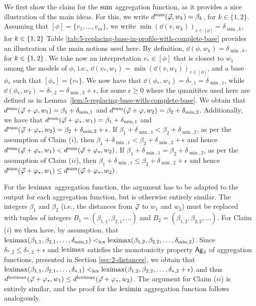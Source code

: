 \begin{prf*}{}{}%
	We first show the claim for the $\ssum$ aggregation function, 
	as it provides a nice illustration of the main ideas.
	For this, we write $\dd^\ssum(\P,w_k)=\beta_k$, for $k\in\{1,2\}$.
	Assuming that $[\phi]=\{v_1,\dots,v_m\}$, we write
	$\min(\dd(v,w_k))_{v\in[\phi]}=\delta_{\min,k}$, for $k\in\set{1,2}$ 
	Table \ref{tab:5-replacing-base-in-profile-with-complete-base} provides an 
	illustration of the main notions used here.
	By definition, $\dd(\phi,w_k)=\delta_{\min,k}$, for $k\in\set{1,2}$.
	We take now an interpretation $v_\ast\in[\phi]$ that is closest 
	to $w_1$ among the models of $\phi$,
	i.e., $\dd(v_\ast,w_1)=\min(\dd(v,w_1))_{v\in[\phi]}$,
	and a base $\phi_\ast$ such that $[\phi_\ast]=\{v_\ast\}$.
	We now have that $\dd(\phi_\ast,w_1)=\delta_{\ast,1}=\delta_{\min,1}$,
	while $\dd(\phi_\ast,w_2)=\delta_{\ast,2}=\delta_{\min,2}+\epsilon$, 
	for some $\epsilon\geq 0$
	where the quanitites used here are defined as in 
	Lemma~\ref{lem:5-replacing-base-with-complete-base}.
	We obtain that $\dd^\ssum(\P+\phi,w_1)=\beta_1+\delta_{\min,1}$ and
	$\dd^\ssum(\P+\phi,w_2)=\beta_2+\delta_{\min,2}$.
	Additionally, we have that
	$\dd^\ssum(\P+\phi_\ast,w_1)=\beta_1+\delta_{\min,1}$ and 
	$\dd^\ssum(\P+\phi_\ast,w_2)=\beta_2+\delta_{\min,2}+\epsilon$.
	If $\beta_1+\delta_{\min,1}< \beta_2+\delta_{\min,2}$, as per the assumption of Claim ($i$),
	then $\beta_1+\delta_{\min,1}< \beta_2+\delta_{\min,2}+\epsilon$
	and hence $\dd^\ssum(\P+\phi_\ast,w_1)<\dd^\ssum(\P+\phi_\ast,w_2)$.
	If $\beta_1+\delta_{\min,1} = \beta_2+\delta_{\min,2}$, as per the assumption of Claim ($ii$),
	then $\beta_1+\delta_{\min,1}\leq\beta_2+\delta_{\min,2}+\epsilon$
	and hence $\dd^\ssum(\P+\phi_\ast,w_1)\leq\dd^\ssum (\P+\phi_\ast,w_2)$.
		
	For the $\leximax$ aggregation function, 
	the argument has to be adapted to the output for each aggregation function, but is
	otherwise entirely similar. 
	The integers $\beta_1$ and $\beta_2$ 
	(i.e., the distances from $\P$ to $w_1$ and $w_2$) 
	must be replaced with tuples of integers 
	$B_1=(\beta_{1,1},\beta_{2,1},\dots)$ and 
	$B_2=(\beta_{1,2},\beta_{2,2},\dots)$. 
	For Claim ($i$) we then have, by assumption, that 
	$\leximax(\beta_{1,1},\beta_{2,1},\dots,\delta_{\min,1})<_{\lex} \leximax(\beta_{1,2},\beta_{2,2},\dots,\delta_{\min,2})$.
	Since $\delta_{\ast,2}\leq\delta_{\ast,2}+\epsilon$ 
	and $\leximax$ satisfies the monotonicity property $\ooa{3}$ of aggregation functions,
	presented in Section \ref{sec:2-distances}, 
	we obtain that 
	$\leximax(\beta_{1,1},\beta_{2,1},\dots,\delta_{\ast,1})<_{\lex}\leximax(\beta_{1,2},\beta_{2,2},\dots,\delta_{\ast,2}+\epsilon)$
	and thus $\dd^\leximax(\P+\phi_\ast,w_1)\leq\dd^\leximax(\P+\phi_\ast,w_2)$. 
	The argument for Claim ($ii$) is entirely similar, 
	and the proof for the $\leximin$ aggregation function follows analogously.
\end{prf*}

